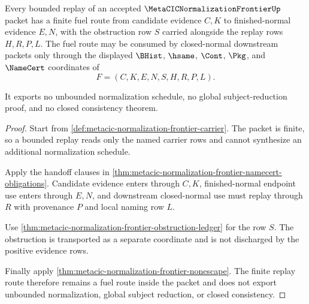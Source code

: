 \begin{theorem}
\label{thm:metacic-normalization-frontier-fuel-route}
Every bounded replay of an accepted $\MetaCICNormalizationFrontierUp$ packet has a finite fuel route from candidate evidence $C,K$ to finished-normal evidence $E,N$, with the obstruction row $S$ carried alongside the replay rows $H,R,P,L$. The fuel route may be consumed by closed-normal downstream packets only through the displayed $\BHist$, $\hsame$, $\Cont$, $\Pkg$, and $\NameCert$ coordinates of
$$
F=(C,K,E,N,S,H,R,P,L).
$$

It exports no unbounded normalization schedule, no global subject-reduction proof, and no closed consistency theorem.
\end{theorem}
\begin{proof}
Start from \autoref{def:metacic-normalization-frontier-carrier}. The packet is finite, so a bounded replay reads only the named carrier rows and cannot synthesize an additional normalization schedule.

Apply the handoff clauses in \autoref{thm:metacic-normalization-frontier-namecert-obligations}. Candidate evidence enters through $C,K$, finished-normal endpoint use enters through $E,N$, and downstream closed-normal use must replay through $R$ with provenance $P$ and local naming row $L$.

Use \autoref{thm:metacic-normalization-frontier-obstruction-ledger} for the row $S$. The obstruction is transported as a separate coordinate and is not discharged by the positive evidence rows.

Finally apply \autoref{thm:metacic-normalization-frontier-nonescape}. The finite replay route therefore remains a fuel route inside the packet and does not export unbounded normalization, global subject reduction, or closed consistency.
\end{proof}

